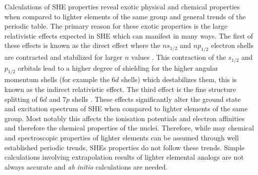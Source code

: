 \documentclass[10pt,a4paper, twoside, openright]{report}
\begin{document}
\linebreak
Calculations of SHE properties reveal exotic physical and chemical properties when compared to lighter elements of the same group and general trends of the periodic table.  The primary reason for these exotic properties is the large relativistic effects expected in SHE which can manifest in many ways. The first of these effects is known as the direct effect where the $ns_{1/2}$ and $np_{1/2}$ electron shells are contracted and stabilized for larger $n$ values \cite{Desclaux1976, Pitzer1979, Pyykko1979}. This contraction of the $s_{1/2}$ and $p_{1/2}$ orbitals lead to a higher degree of shielding for the higher angular momentum shells (for example the $6d$ shells) which destabilizes them, this is known as the indirect relativistic effect. The third effect is the fine structure splitting of $6d$ and $7p$ shells \cite{Pyykko1988, DF2016, LDFSg2019}. These effects significantly alter the ground state and excitation spectrum of SHE when compared to lighter elements of the same group. Most notably this affects the ionisation potentials and electron affinities and therefore the chemical properties of the nuclei. Therefore, while may chemical and spectroscopic properties of lighter elements can be assumed through well established periodic trends, SHEs properties do not follow these trends. Simple calculations involving extrapolation results of lighter elemental analogs are not always accurate and \textit{ab initio} calculations are needed.\\
\linebreak
\end{document}
